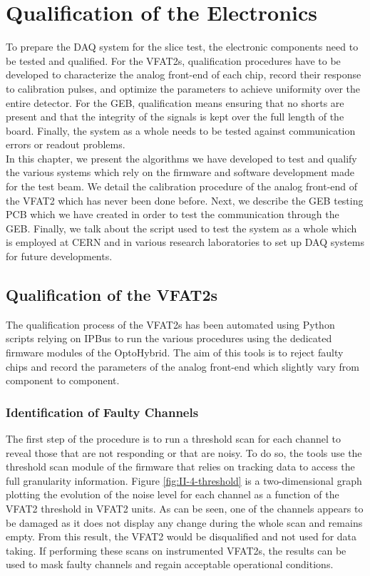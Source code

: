 \chapter{Qualification of the Electronics}
\label{chap:II-4-qualification}

  To prepare the DAQ system for the slice test, the electronic components need to be tested and qualified. For the VFAT2s, qualification procedures have to be developed to characterize the analog front-end of each chip, record their response to calibration pulses, and optimize the parameters to achieve uniformity over the entire detector. For the GEB, qualification means ensuring that no shorts are present and that the integrity of the signals is kept over the full length of the board. Finally, the system as a whole needs to be tested against communication errors or readout problems. \\

  In this chapter, we present the algorithms we have developed to test and qualify the various systems which rely on the firmware and software development made for the test beam. We detail the calibration procedure of the analog front-end of the VFAT2 which has never been done before. Next, we describe the GEB testing PCB which we have created in order to test the communication through the GEB. Finally, we talk about the script used to test the system as a whole which is employed at CERN and in various research laboratories to set up DAQ systems for future developments.

  \section{Qualification of the VFAT2s}

    The qualification process of the VFAT2s has been automated using Python scripts relying on IPBus to run the various procedures using the dedicated firmware modules of the OptoHybrid. The aim of this tools is to reject faulty chips and record the parameters of the analog front-end which slightly vary from component to component.

    \subsection{Identification of Faulty Channels}

      The first step of the procedure is to run a threshold scan for each channel to reveal those that are not responding or that are noisy. To do so, the tools use the threshold scan module of the firmware that relies on tracking data to access the full granularity information. Figure \ref{fig:II-4-threshold} is a two-dimensional graph plotting the evolution of the noise level for each channel as a function of the VFAT2 threshold in VFAT2 units. As can be seen, one of the channels appears to be damaged as it does not display any change during the whole scan and remains empty. From this result, the VFAT2 would be disqualified and not used for data taking. If performing these scans on instrumented VFAT2s, the results can be used to mask faulty channels and regain acceptable operational conditions.

